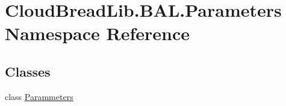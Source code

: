 \hypertarget{namespace_cloud_bread_lib_1_1_b_a_l_1_1_parameters}{}\section{Cloud\+Bread\+Lib.\+B\+A\+L.\+Parameters Namespace Reference}
\label{namespace_cloud_bread_lib_1_1_b_a_l_1_1_parameters}
\subsection*{Classes}
\begin{DoxyCompactItemize}
\item 
class \hyperlink{class_cloud_bread_lib_1_1_b_a_l_1_1_parameters_1_1_parammeters}{Parammeters}
\end{DoxyCompactItemize}
